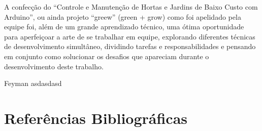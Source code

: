 \documentclass[a4paper,12pt]{article}
\begin{document}
A confecção do “Controle e Manutenção de Hortas e Jardins de Baixo Custo com Arduino”, ou ainda projeto “greew” (green + grow) como foi apelidado pela equipe foi, além de um grande aprendizado técnico, uma ótima oportunidade para aperfeiçoar a arte de se trabalhar em equipe, explorando diferentes técnicas de desenvolvimento simultâneo, dividindo tarefas e responsabilidades e pensando em conjunto como solucionar os desafios que apareciam durante o desenvolvimento deste trabalho.


Feyman asdasdasd \cite{altieri1}
%
\renewcommand\refname{}


\newpage
\section{Referências Bibliográficas}
\renewcommand\refname{}

%
%
\end{document}
